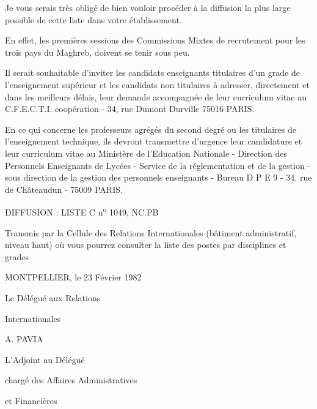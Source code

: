 Je vous serais très obligé de bien vouloir procéder à la diffusion la plus large possible de cette liste dans votre établissement.

En effet, les premières sessions des Commissions Mixtes de recrutement pour les trois pays du Maghreb, doivent se tenir sous peu.

Il serait souhaitable d'inviter les candidats enseignants titulaires d'un grade de l'enseignement supérieur et les candidats non titulaires à adresser, directement et dans les meilleurs délais, leur demande accompagnée de leur curriculum vitae au C.F.E.C.T.I.  coopération - 34, rue Dumont Durville 75016 PARIS.

En ce qui concerne les professeurs agrégés du second degré ou les titulaires de l'enseignement technique, ils devront transmettre d'urgence leur candidature et leur curriculum vitae au Ministère de l'Education Nationale - Direction des Personnels Enseignants de Lycées - Service de la réglementation et de la gestion - sous direction de la gestion des personnels enseignants - Bureau D P E 9 - 34, rue de Châteaudun - 75009 PARIS.

DIFFUSION : LISTE C n\textsuperscript{o} 1049, NC.PB

Transmis par la Cellule des Relations Internationales (bâtiment administratif, niveau haut) où vous pourrez consulter la liste des postes par disciplines et grades

MONTPELLIER, le 23 Février 1982

Le Délégué aux Relations\par Internationales

A. PAVIA

L'Adjoint au Délégué\par chargé des Affaires Administratives\par et Financières

